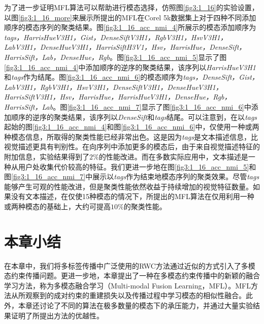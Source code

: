 为了进一步证明MFL算法可以帮助进行模态选择，仿照图\ref{fig3:1_16}的实验设置，以图\ref{fig3:1_16_more}来展示所提出的MFL在Corel 5k数据集上对于四种不同添加顺序的模态序列的聚类结果。图\ref{fig3:1_16_acc_nmi_4}所展示的模态添加顺序为\textit{tags，HarrisHueV3H1，Gist，DenseSiftV3H1，RgbV3H1，HsvV3H1，LabV3H1，DenseHueV3H1，HarrisSiftH3V1，Hsv，HarrisHue，DenseSift，HarrisSift，Lab，DenseHue，Rgb}。图\ref{fig3:1_16_acc_nmi_5}显示了图\ref{fig3:1_16_acc_nmi_4}中添加顺序的逆序的聚类结果，该序列以\textit{HarrisHueV3H1}和\textit{tags}作为结尾。图\ref{fig3:1_16_acc_nmi_6}的模态顺序为\textit{tags，DenseSift，Gist，LabV3H1，RgbV3H1，HsvV3H1，DenseSiftV3H1，DenseHueV3H1，HarrisSiftV3H1，Hsv，HarrisHue，HarrisHueV3H1，DenseHue，Rgb，HarrisSift，Lab}。图\ref{fig3:1_16_acc_nmi_7}显示了图\ref{fig3:1_16_acc_nmi_6}中添加顺序的逆序的聚类结果，该序列以\textit{DenseSift}和\textit{tags}结尾。可以注意到，在以\textit{tags}起始的图\ref{fig3:1_16_acc_nmi_4}和图\ref{fig3:1_16_acc_nmi_6}中，仅使用一种或两种模态信息，所取得的聚类性能已经非常出色。这是因为\textit{tags}是文本描述信息，比视觉描述更具有判别性。在向序列中添加更多的模态后，由于来自视觉描述特征的附加信息，实验结果得到了$2\%$的性能改进。而在多数实际应用中，文本描述是一种从用户处收集代价较高的特征。我们更进一步地在图\ref{fig3:1_16_acc_nmi_5}和图\ref{fig3:1_16_acc_nmi_7}中展示以\textit{tags}作为结束地模态序列的聚类效果。尽管\textit{tags}能够产生可观的性能改进，但是聚类性能依然收益于持续增加的视觉特征数量。如果没有文本描述，在仅使15种模态的情况下，所提出的MFL算法在仅用利用一种或两种模态的基础上，大约可提高$10\%$的聚类性能。

\section{本章小结}
在本章中，我们将多标签传播中广泛使用的RWC方法通过近似的方式引入了多模态约束传播问题。更进一步地，本章提出了一种在多模态约束传播中的新颖的融合学习方法，称为多模态融合学习（Multi-modal Fusion Learning，MFL）。MFL方法从所观察到的成对约束的重建损失以及传播过程中学习模态的相似性融合。此外，本章还讨论了不同的算法在极多数量的模态下的承压能力，并通过大量实验结果证明了所提出方法的优越性。